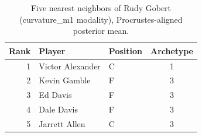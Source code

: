 \begin{table}[htbp]
  \centering\small
  \begin{tabular}{rllc}
    \toprule
    Rank & Player & Position & Archetype \\
    \midrule
    1 & Victor Alexander & C & 1 \\
    2 & Kevin Gamble & F & 3 \\
    3 & Ed Davis & F & 3 \\
    4 & Dale Davis & F & 3 \\
    5 & Jarrett Allen & C & 3 \\
    \bottomrule
  \end{tabular}
  \caption{Five nearest neighbors of Rudy Gobert (curvature_m1 modality), Procrustes-aligned posterior mean.}
  \label{tab:Rudy_Gobert_neighbors_curvature_m1}
\end{table}

